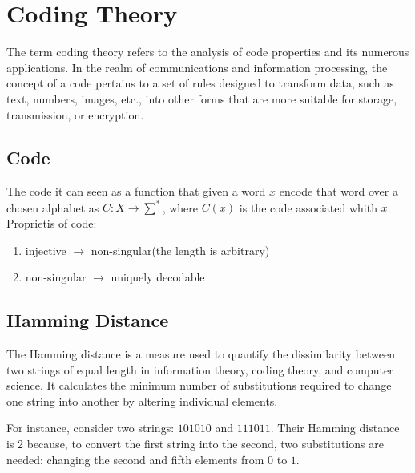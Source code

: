 \section{Coding Theory}
The term coding theory refers to the analysis of code properties and its numerous applications. In the realm of communications and information processing, the concept of a code pertains to a set of rules designed to transform data, such as text, numbers, images, etc., into other forms that are more suitable for storage, transmission, or encryption. %
\subsection{Code}
The code it can seen as a function that given a word $x$ encode that word over a chosen alphabet as $C: X \rightarrow \sum ^*$, where $C(x)$ is the code associated whith $x$. Proprietis of code:
\begin{enumerate}
 \item injective $\rightarrow$ non-singular(the length is arbitrary)
 \item non-singular $\rightarrow$ uniquely decodable
\end{enumerate}

\subsection{Hamming Distance}
The Hamming distance is a measure used to quantify the dissimilarity between two strings of equal length in information theory, coding theory, and computer science. It calculates the minimum number of substitutions required to change one string into another by altering individual elements.

For instance, consider two strings: $101010$ and $111011$. Their Hamming distance is 2 because, to convert the first string into the second, two substitutions are needed: changing the second and fifth elements from $0$ to $1$.

